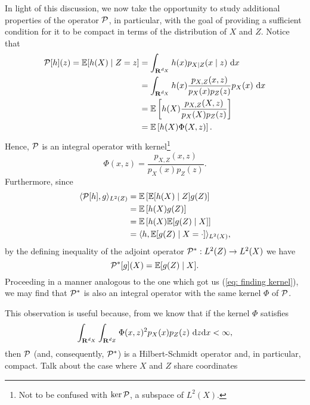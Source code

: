 In light of this discussion, we now take the opportunity to study additional properties of the operator $ \mathcal{P} $, in particular, with the goal of providing a sufficient condition for it to be compact in terms of the distribution of $ X $ and $ Z $.
Notice that
\begin{align}
    \mathcal{P} [ h ] ( z )
    = \mathbb{E} [ h ( X ) \mid Z = z ] 
    &= \int_{ \mathbf{R}^{ d_{ X } } } h ( x ) p_{ X \mid Z } ( x \mid z ) \ \mathrm{d} x \nonumber \\
    &= \int_{ \mathbf{R}^{ d_{ X } } } h ( x ) \frac{ p_{ X, Z } ( x, z ) }{ p_{ X } ( x ) p_{ Z } ( z ) } p_{ X } ( x ) \ \mathrm{d} x \nonumber \\
    &= \mathbb{E} \left[
        h ( X ) \frac{ p_{ X, Z } ( X, z ) }{ p_{ X } ( X ) p_{ Z } ( z ) }
    \right] \nonumber \\
    &= \mathbb{E} \left[ h ( X ) \Phi ( X, z ) \right] \label{eq: finding kernel}
.\end{align}
Hence, $ \mathcal{P} $ is an integral operator with kernel\footnote{Not to be confused with $ \ker \mathcal{P} $, a subspace of $ L^{ 2 } ( X ) $.}
\begin{equation*}
    \Phi ( x, z ) = \frac{ p_{ X, Z } ( x, z ) }{ p_{ X } ( x ) p_{ Z } ( z ) }
.\end{equation*}
Furthermore, since
\begin{align*}
    \langle  \mathcal{P}[h], g  \rangle_{ L^{ 2 } ( Z ) }
    &= \mathbb{E} \left[ \mathbb{E} [ h ( X ) \mid Z ] g ( Z ) \right] \\
    &= \mathbb{E} \left[ h ( X ) g ( Z ) \right] \\
    &= \mathbb{E} \left[ h ( X ) \mathbb{E} [ g ( Z ) \mid X ] \right] \\
    &= \langle  h, \mathbb{E} [ g ( Z ) \mid X = \cdot ]  \rangle_{ L^{ 2 } ( X ) }
,\end{align*}
by the defining inequality of the adjoint operator $ \mathcal{P}^{ * } : L^{ 2 } ( Z ) \to L^{ 2 } ( X ) $ we have
\begin{equation*}
    \mathcal{P}^{ * } [ g ] ( X ) = \mathbb{E} [ g ( Z ) \mid X ]
.\end{equation*}
Proceeding in a manner analogous to the one which got us (\ref{eq: finding kernel}), we may find that $ \mathcal{P}^{ * } $ is also an integral operator with the same kernel $ \Phi $ of $ \mathcal{P} $.

This observation is useful because, from \cite[Theorem 2.34]{florens2007} we know that if the kernel $ \Phi $ satisfies
\begin{equation}
    \label{eq: Phi square integrable}
    \int_{ \mathbf{R}^{ d_{ X } } } \int_{ \mathbf{R}^{ d_{ Z } } } \Phi ( x, z )^2 p_{ X } ( x ) p_{ Z } ( z ) \ \mathrm{d} z \mathrm{d} x < \infty
,\end{equation}
then $ \mathcal{P} $ (and, consequently, $ \mathcal{P}^{ * } $) is a Hilbert-Schmidt operator and, in particular, compact.
{\color{red} Talk about the case where $ X $ and $ Z $ share coordinates}

